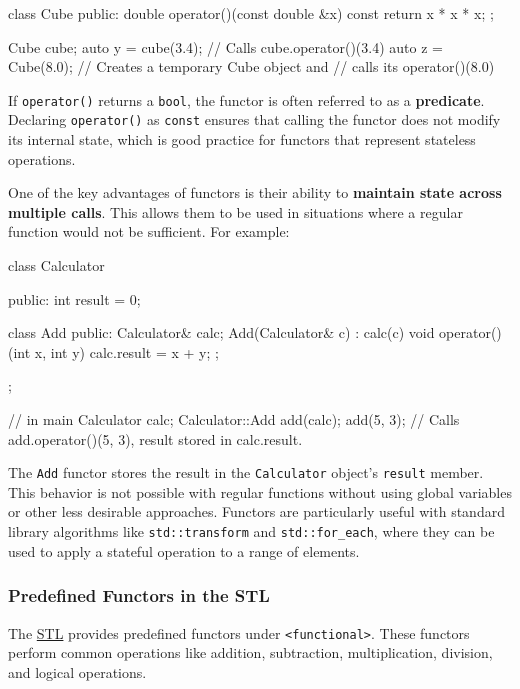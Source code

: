 \begin{codeblock}[language=C++]
class Cube {
public:
    double operator()(const double &x) const { return x * x * x; }
};

Cube cube;
auto y = cube(3.4);   // Calls cube.operator()(3.4)
auto z = Cube{}(8.0); // Creates a temporary Cube object and 
                      //     calls its operator()(8.0)
\end{codeblock}

If \texttt{operator()} returns a \texttt{bool}, the functor is often referred to as a \textbf{predicate}. Declaring \texttt{operator()} as \texttt{const} ensures that calling the functor does not modify its internal state, which is good practice for functors that represent stateless operations.

One of the key advantages of functors is their ability to \textbf{maintain state across multiple calls}. This allows them to be used in situations where a regular function would not be sufficient. For example:

\begin{codeblock}[language=C++]
class Calculator {
public:
    int result = 0;

    class Add {
    public:
        Calculator& calc;
        Add(Calculator& c) : calc(c) {}
        void operator()(int x, int y) { calc.result = x + y; }
    };
};

// in main
Calculator calc;
Calculator::Add add(calc);
add(5, 3); // Calls add.operator()(5, 3), result stored in calc.result.
\end{codeblock}

The \texttt{Add} functor stores the result in the \texttt{Calculator} object's \texttt{result} member. This behavior is not possible with regular functions without using global variables or other less desirable approaches. Functors are particularly useful with standard library algorithms like \texttt{std::transform} and \texttt{std::for\_each}, where they can be used to apply a stateful operation to a range of elements.

\subsubsection{Predefined Functors in the STL}

The \hyperref[ch:stl]{STL} provides predefined functors under \texttt{<functional>}. These functors perform common operations like addition, subtraction, multiplication, division, and logical operations.

